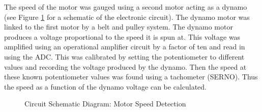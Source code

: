 \documentclass[twoside,a4]{report}
\def\br{\newline \newline \noindent}
\begin{document}
	The speed of the motor was gauged using a second motor acting as a dynamo (see Figure \ref{circspeeddet} for a schematic of the electronic circuit). The dynamo motor was linked to the first motor by a belt and pulley system. The dynamo motor produces a voltage proportional to the speed it is spun at. This voltage was amplified using an operational amplifier circuit by a factor of ten and read in using the ADC. This was calibrated by setting the potentiometer to different values and recording the voltage produced by the dynamo. Then the speed at these known potentiometer values was found using a tachometer (SERNO). Thus the speed as a function of the dynamo voltage can be calculated. \br
	\begin{figure}[!htb]
		\centering
		\caption{Circuit Schematic Diagram: Motor Speed Detection}
		\label{circspeeddet}
	\end{figure}
	
\end{document}
